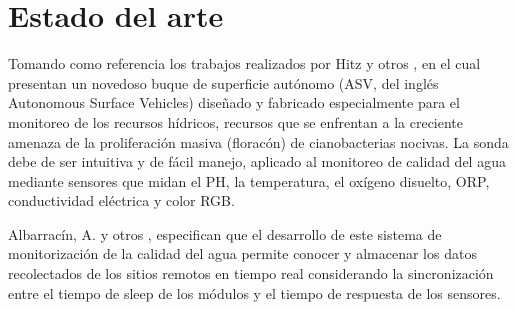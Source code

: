 \section{Estado del arte}


Tomando como referencia los trabajos realizados por Hitz y otros \cite{hitz2012design}, en el cual presentan un novedoso buque de superficie autónomo (ASV, del ingl\'es Autonomous Surface Vehicles) dise\~nado y fabricado especialmente para el monitoreo de los recursos h\'idricos, recursos que se enfrentan a la creciente amenaza de la proliferaci\'on masiva (florac\'on) de cianobacterias nocivas. La sonda debe de ser intuitiva y de f\'acil manejo, aplicado al monitoreo de calidad del agua mediante sensores que midan el PH, la temperatura, el ox\'igeno disuelto,  ORP, conductividad el\'ectrica y color RGB. 

Albarrac\'in, A. y otros \cite{samaniegodevelopment}, especifican que el desarrollo de este sistema de monitorizaci\'on de la calidad del agua permite conocer y almacenar los datos recolectados de los sitios remotos en tiempo real considerando la sincronizaci\'on entre el tiempo de sleep de los m\'odulos y el tiempo de respuesta de los sensores. 


